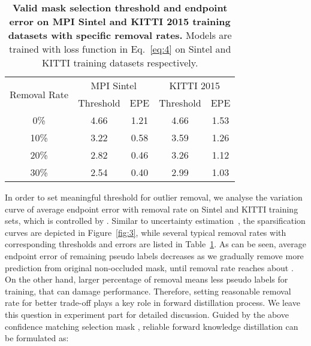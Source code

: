\documentclass[lettersize,journal]{IEEEtran}
\begin{document}
\begin{table}[t]
	\renewcommand\arraystretch{1.1}
	\caption{\textbf{Valid mask selection threshold and endpoint error on MPI Sintel and KITTI 2015 training datasets with specific removal rates.} Models are trained with loss function in Eq.~\ref{eq:4} on Sintel and KITTI training datasets respectively.}
	\label{tab:1}
	\centering
	\renewcommand{\arraystretch}{1.1}
	\tabcolsep=3.6mm
	\begin{tabular}{c|cc|cc}
		\toprule
		\multirow{2}{*}{Removal Rate} & \multicolumn{2}{c|}{MPI Sintel} & \multicolumn{2}{c}{KITTI 2015} \\
		& \multicolumn{1}{c}{Threshold} & \multicolumn{1}{c|}{EPE} & \multicolumn{1}{c}{Threshold} & \multicolumn{1}{c}{EPE} \\
		\midrule
		\multicolumn{1}{c|}{0\%} & 4.66 & 1.21 & 4.66 & 1.53 \\
		\multicolumn{1}{c|}{10\%} & 3.22 & 0.58 & 3.59 & 1.26 \\
		\multicolumn{1}{c|}{20\%} & 2.82 & 0.46 & 3.26 & 1.12 \\
		\multicolumn{1}{c|}{30\%} & 2.54 & 0.40 & 2.99 & 1.03 \\
		\bottomrule
	\end{tabular}
\end{table}

In order to set meaningful threshold for outlier removal, we analyse the variation curve of average endpoint error with removal rate on Sintel and KITTI training sets, which is controlled by . Similar to uncertainty estimation~\cite{10.1007/978-3-030-01234-2_40}, the sparsification curves are depicted in Figure~\ref{fig:3}, while several typical removal rates with corresponding thresholds and errors are listed in Table~\ref{tab:1}. As can be seen, average endpoint error of remaining pseudo labels decreases as we gradually remove more prediction from original non-occluded mask, until removal rate reaches about . On the other hand, larger percentage of removal means less pseudo labels for training, that can damage performance. Therefore, setting reasonable removal rate for better trade-off plays a key role in forward distillation process. We leave this question in experiment part for detailed discussion. Guided by the above confidence matching selection mask , reliable forward knowledge distillation can be formulated as:
\end{document}
